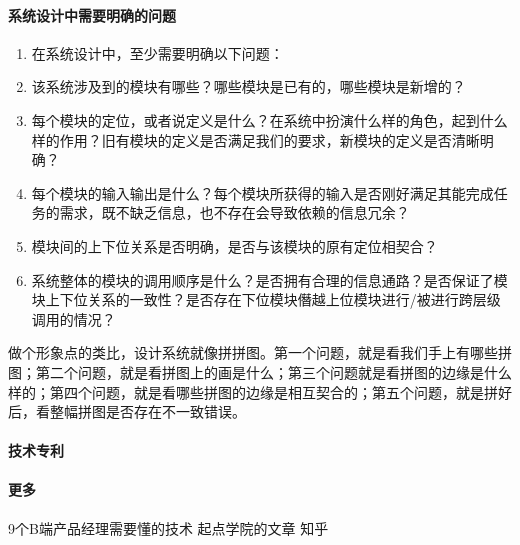 \documentclass[letterpaper,11pt,english]{sphinxmanual}
\begin{document}
\paragraph{系统设计中需要明确的问题}
\label{\detokenize{chapter_idea/understand_tech:id41}}\begin{enumerate}
%
\item {} 
在系统设计中，至少需要明确以下问题：

\item {} 
该系统涉及到的模块有哪些？哪些模块是已有的，哪些模块是新增的？

\item {} 
每个模块的定位，或者说定义是什么？在系统中扮演什么样的角色，起到什么样的作用？旧有模块的定义是否满足我们的要求，新模块的定义是否清晰明确？

\item {} 
每个模块的输入输出是什么？每个模块所获得的输入是否刚好满足其能完成任务的需求，既不缺乏信息，也不存在会导致依赖的信息冗余？

\item {} 
模块间的上下位关系是否明确，是否与该模块的原有定位相契合？

\item {} 
系统整体的模块的调用顺序是什么？是否拥有合理的信息通路？是否保证了模块上下位关系的一致性？是否存在下位模块僭越上位模块进行/被进行跨层级调用的情况？

\end{enumerate}

做个形象点的类比，设计系统就像拼拼图。第一个问题，就是看我们手上有哪些拼图；第二个问题，就是看拼图上的画是什么；第三个问题就是看拼图的边缘是什么样的；第四个问题，就是看哪些拼图的边缘是相互契合的；第五个问题，就是拼好后，看整幅拼图是否存在不一致错误。
%
\begin{footnote}[380]\sphinxAtStartFootnote
{}
%
\end{footnote}


\paragraph{技术专利}
\label{\detokenize{chapter_idea/understand_tech:id42}}


\paragraph{更多}
\label{\detokenize{chapter_idea/understand_tech:id43}}
9个B端产品经理需要懂的技术 \sphinxhyphen{} 起点学院的文章 \sphinxhyphen{} 知乎
\end{document}

